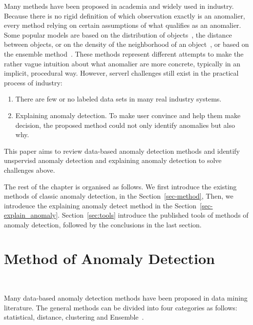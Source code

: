 Many metheds have been proposed in academia and 
widely used in industry.
Because there is no rigid definition of which
observation exactly is an anomalier,
every method relying on certain assumptions of
what qualifies as an anomalier.
Some popular models are based on 
the distribution of 
objects~\cite{siripanadorn2010anomaly,chandola2009anomaly,kromanis2013support},
the distance~\cite{knorr1997unified} 
between objects,
or on the density of
the neighborhood of 
an object~\cite{agyemang2004algorithm,breunig2000lof,papadimitriou2003loci},
or based on the ensemble method~\cite{zhou2012ensemble}.
These methods represent different attempts to make
the rather vague intuition about 
what anomalier are more concrete,
typically in an implicit,
procedural way.
However,
serverl challenges still exist
in the practical  process of industry:
\begin{enumerate}
    \item There are few or no labeled data sets in 
    many real industry systems.
    \item Explaining anomaly detection.
    To make  user convince and help them make decision,
    the proposed method could not only identify anomalies but also
    why.
\end{enumerate}
This paper aims to review data-based anomaly detection methods and
identify unspervisd anomaly detection and explaining anomaly detection
to solve challenges above.

The rest of the chapter is organised as follows.
We first introduce the existing methods of classic anomaly detection,
in the Section~\ref{sec-method},
Then,
we introdeuce the explaining anomaly detect method
in the Section~\ref{sec-explain_anomaly}.
Section~\ref{sec:tools} introduce the published tools of
methods of anomaly detection,
followed by the conclusions in the last section.

\section{Method of Anomaly Detection}~\label{sec-method}

Many data-based anomaly detection methods have been proposed in
data mining literature.
The general methods can be divided into four categories as follows: 
statistical, 
distance, 
clustering and Ensemble~\cite{cook2019anomaly}.

